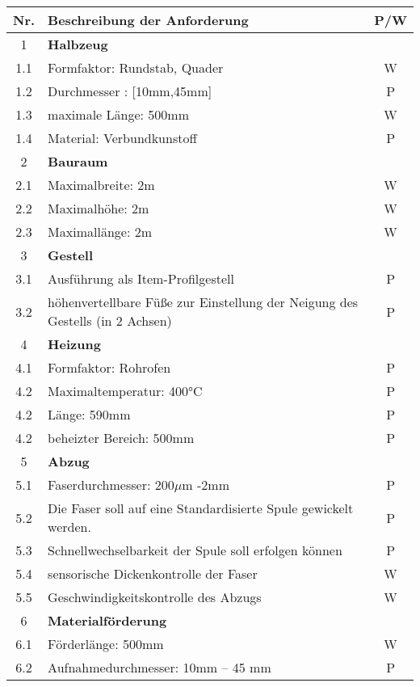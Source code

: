 
\begin{center}
\begin{longtable}{|c| l| c|} 
 \hline
Nr. & Beschreibung der Anforderung &   P/W\\ 
 \hline
  1 &  \textbf{Halbzeug} &   \\ 
  1.1 & Formfaktor: Rundstab, Quader & W \\
  1.2 & Durchmesser : [10mm,45mm] & P\\
  1.3 & maximale Länge: 500mm & W\\
  1.4 & Material: Verbundkunstoff & P \\ 
 \hline
  2 & \textbf{Bauraum}&    \\
  2.1 & Maximalbreite: 2m & W \\
  2.2 & Maximalhöhe: 2m & W \\
  2.3 & Maximallänge: 2m & W \\
 \hline
  3 & \textbf{Gestell}&    \\
  3.1 & Ausführung als Item-Profilgestell & P \\
  3.2 & höhenvertellbare Füße zur Einstellung der Neigung des Gestells (in 2 Achsen) & P \\
 \hline
  4 & \textbf{Heizung}&    \\
  4.1 & Formfaktor: Rohrofen& P \\
  4.2 &  Maximaltemperatur: 400°C & P \\
  4.2 &  Länge: 590mm & P \\
  4.2 & beheizter Bereich: 500mm & P \\
  \hline
  5 & \textbf{Abzug} & \\
  5.1 & Faserdurchmesser: 200$\mu$m -2mm & P\\
  5.2 & Die Faser soll auf eine Standardisierte Spule gewickelt werden. & P\\
  5.3 & Schnellwechselbarkeit der Spule soll erfolgen können & P\\
  5.4 & sensorische Dickenkontrolle der Faser & W\\
  5.5 & Geschwindigkeitskontrolle des Abzugs & W \\
  \hline
  6 & \textbf{Materialförderung} &\\
  6.1 & Förderlänge: 500mm & W \\
  6.2 & Aufnahmedurchmesser: 10mm – 45 mm & P\\

\end{longtable}
\end{center}
